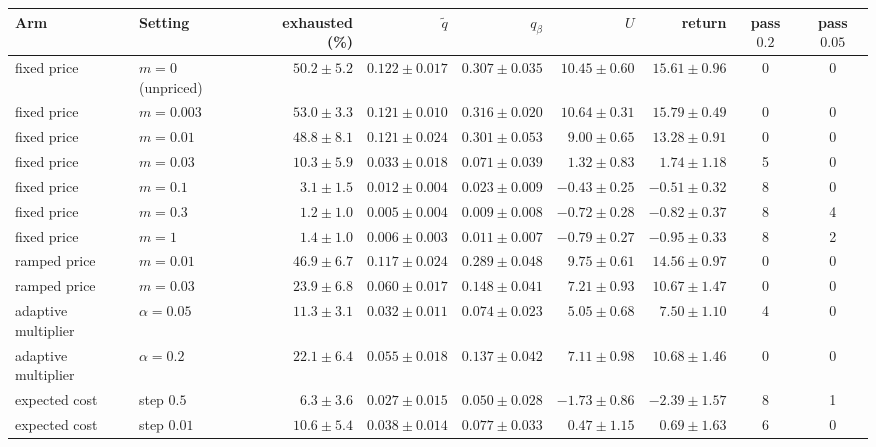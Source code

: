 \setlength{\tabcolsep}{3pt}\begin{tabular}{llrrrrrcc}
\toprule
Arm & Setting & exhausted (\%) & $\tilde q$ & $q_\beta$ & $U$ & return & pass $0.2$ & pass $0.05$\\
\midrule
fixed price & $m=0$ (unpriced) & $50.2\pm5.2$ & $0.122\pm0.017$ & $0.307\pm0.035$ & $10.45\pm0.60$ & $15.61\pm0.96$ & 0 & 0\\
fixed price & $m=0.003$ & $53.0\pm3.3$ & $0.121\pm0.010$ & $0.316\pm0.020$ & $10.64\pm0.31$ & $15.79\pm0.49$ & 0 & 0\\
fixed price & $m=0.01$ & $48.8\pm8.1$ & $0.121\pm0.024$ & $0.301\pm0.053$ & $9.00\pm0.65$ & $13.28\pm0.91$ & 0 & 0\\
fixed price & $m=0.03$ & $10.3\pm5.9$ & $0.033\pm0.018$ & $0.071\pm0.039$ & $1.32\pm0.83$ & $1.74\pm1.18$ & 5 & 0\\
fixed price & $m=0.1$ & $3.1\pm1.5$ & $0.012\pm0.004$ & $0.023\pm0.009$ & $-0.43\pm0.25$ & $-0.51\pm0.32$ & 8 & 0\\
fixed price & $m=0.3$ & $1.2\pm1.0$ & $0.005\pm0.004$ & $0.009\pm0.008$ & $-0.72\pm0.28$ & $-0.82\pm0.37$ & 8 & 4\\
fixed price & $m=1$ & $1.4\pm1.0$ & $0.006\pm0.003$ & $0.011\pm0.007$ & $-0.79\pm0.27$ & $-0.95\pm0.33$ & 8 & 2\\
ramped price & $m=0.01$ & $46.9\pm6.7$ & $0.117\pm0.024$ & $0.289\pm0.048$ & $9.75\pm0.61$ & $14.56\pm0.97$ & 0 & 0\\
ramped price & $m=0.03$ & $23.9\pm6.8$ & $0.060\pm0.017$ & $0.148\pm0.041$ & $7.21\pm0.93$ & $10.67\pm1.47$ & 0 & 0\\
adaptive multiplier & $\alpha=0.05$ & $11.3\pm3.1$ & $0.032\pm0.011$ & $0.074\pm0.023$ & $5.05\pm0.68$ & $7.50\pm1.10$ & 4 & 0\\
adaptive multiplier & $\alpha=0.2$ & $22.1\pm6.4$ & $0.055\pm0.018$ & $0.137\pm0.042$ & $7.11\pm0.98$ & $10.68\pm1.46$ & 0 & 0\\
expected cost & step $0.5$ & $6.3\pm3.6$ & $0.027\pm0.015$ & $0.050\pm0.028$ & $-1.73\pm0.86$ & $-2.39\pm1.57$ & 8 & 1\\
expected cost & step $0.01$ & $10.6\pm5.4$ & $0.038\pm0.014$ & $0.077\pm0.033$ & $0.47\pm1.15$ & $0.69\pm1.63$ & 6 & 0\\
\bottomrule
\end{tabular}
